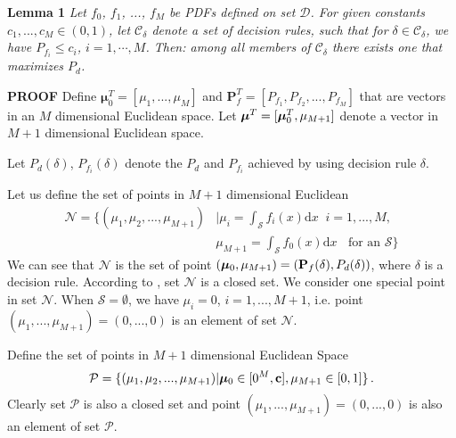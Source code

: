 \noindent \textbf{Lemma 1}
\noindent \textit{Let $f_0$, $f_1$, ..., $f_M$ be PDFs defined on set $\mathcal{D}$. For given constants $c_1, ..., c_M \in (0, 1)$, let $\mathcal{C}_\delta$ denote a set of decision rules,  such that for $\delta \in \mathcal{C}_\delta$, we have $P_{f_i} \leq c_i$, $i = 1, \cdots, M$. Then:
 among all members of $\mathcal{C}_\delta$ there exists one that maximizes $P_d$.}

\noindent \textbf{PROOF}
Define $\boldsymbol{\mu}_0^T = [\mu_1, ..., \mu_M]$  and  $\mathbf{P}_f^T = [P_{f_1}, P_{f_2}, ..., P_{f_M}]$ that are vectors in an $M$ dimensional Euclidean  space. Let $\boldsymbol{\mu}^T = [\boldsymbol{\mu}_0^T, \mu_{M+1}]$ denote a vector in $M+1$ dimensional Euclidean space. 

Let $P_d(\delta)$, $P_{f_i}(\delta)$ denote the $P_d$ and $P_{f_i}$ achieved by using decision rule $\delta$.

Let us define the set of points in $M+1$ dimensional Euclidean
\begin{equation}
\begin{split}
\label{2015apr28a0}
  \mathcal{N} = \{(\mu_1, \mu_2, ..., \mu_{M+1}) &| \mu_i = \int_{\mathcal{S}}f_i(x)\mathrm{d}x \;\;i=1, ..., M,\\
                                            &  \mu_{M+1}=\int_{\mathcal{S}}f_{0}(x)\mathrm{d}x \;\;\text{ for an $\mathcal{S}$}\}
\end{split}
\end{equation}
We can see that $\mathcal{N}$ is the set of point $(\boldsymbol{\mu}_0, \mu_{M+1})=(\mathbf{P}_f(\delta), P_d(\delta))$, where $\delta$ is a decision rule. According to \cite{LehmannTest}, set $\mathcal{N}$ is a closed set. We consider one special point in set $\mathcal{N}$. When $\mathcal{S} = \emptyset$, we have $\mu_i = 0$, $i = 1, ..., M+1$, i.e. point $(\mu_1, ..., \mu_{M+1}) = (0, ..., 0)$ is an element of set $\mathcal{N}$.

Define the set of points in $M+1$ dimensional Euclidean Space 
\begin{equation}
\mathcal{P} = \{
(\mu_1, \mu_2, ..., \mu_{M+1}) | \boldsymbol{\mu}_0 \in [0^M, \mathbf{c}], \mu_{M+1} \in [0, 1]
\}\,.
\end{equation}
Clearly set $\mathcal{P}$ is also a closed set and point $(\mu_1, ..., \mu_{M+1}) = (0, ..., 0)$ is also an element  of set $\mathcal{P}$.


